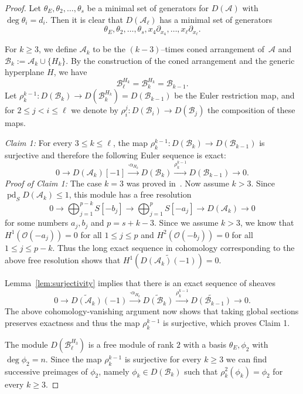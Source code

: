\documentclass[a4paper,11pt]{amsart}
\def\A{{\mathcal{A}}}%
\def\B{{\mathcal{B}}}%
\def\G{{\mathcal{G}}}%
\def\O{{\mathcal{O}}}%
\DeclareMathOperator{\pd}{pd}
\numberwithin{equation}{section}
\theoremstyle{remark}
\begin{document}
\begin{proof}
Let $\theta_E,\theta_2,\ldots,\theta_s$ be a minimal set of generators for $D(\A)$ with $\deg \theta_i=d_i$. Then it is clear that $D(\A_\ell)$ has a minimal set of generators 
$$
\theta_E,\theta_2,\ldots,\theta_s,x_4\partial_{x_4},\ldots,x_\ell\partial_{x_\ell}.
$$

For $k\ge 3$, we define $\A_k$ to be the $(k-3)$--times coned arrangement of~$\A$ and
$\B_k:=\A_k \cup \{H_k\}$.
By the construction of the coned arrangement and the generic hyperplane $H$, we have
\[
	\B_\ell^{H_k}=\B_k^{H_k} = \B_{k-1}.
\]
Let $\rho_k^{k-1}:D(\B_k)\to D(\B_k^{H_k})=D(\B_{k-1})$ be the Euler restriction map, and for $2\le j < i \le \ell$ we denote by $\rho_i^j:D(\B_i)\to D(\B_j)$ the composition of these maps.

\emph{Claim 1:} For every $3\le k \le \ell$, the map $\rho_k^{k-1}:D(\B_k)\to D(\B_{k-1})$ is surjective and therefore the following Euler sequence is exact:
\begin{equation}\label{eq:exact_euler}
0 \rightarrow D(\A_k)[-1] \stackrel{\cdot \alpha_{H_k}}{\rightarrow}
D(\B_k) \stackrel{\rho_k^{k-1}}{\rightarrow } D(\B_{k-1}) \rightarrow 0.
\end{equation}
\emph{Proof of Claim 1:}
The case $k=3$ was proved in~.
Now assume $k>3$.
Since $\pd_S D(\A_k)\le 1$, this module has a free resolution
$$
0 \rightarrow 
\bigoplus_{j=1}^{p - k} S[-b_j]
\rightarrow 
\bigoplus_{j=1}^{p} S[-a_j]
\rightarrow D(\A_k) \rightarrow 0
$$
for some numbers $a_j, b_j$ and $p=s+k-3$.
Since we assume $k>3$, we know that $H^1(\O(-a_j))=0$ for all $1\le j \le p$ and $H^2(\O(-b_j))=0$ for all $1\le j \le p-k$.
Thus the long exact sequence in cohomology corresponding to the above free resolution shows that $H^1(\widetilde{D(\A_k)(-1)})=0$.

Lemma~\ref{lem:surjectivity} implies that there is an exact sequence of sheaves
\[
0 \rightarrow 
\widetilde{D(\A_k)}(-1) \stackrel{\cdot \alpha_{H_k}}{\rightarrow}
\widetilde{D(\B_k)} \stackrel{\rho_k^{k-1}}{\rightarrow}
\widetilde{D(\B_{k-1})} \rightarrow 0.
\]
The above cohomology-vanishing argument now shows that taking global sections preserves exactness and thus the map $\rho_k^{k-1}$ is surjective, which proves Claim 1.

The module $D(\B_\ell^{H_3})$ is a free module of rank $2$ with a basis $\theta_E,\phi_2$ with $\deg \phi_2 = n$.
Since the map $\rho_k^{k-1}$ is surjective for every $k\ge 3$ we can find successive preimages of $\phi_2$, namely $\phi_k\in D(\B_k)$ such that $\rho_k^2(\phi_k)=\phi_2$ for every $k\ge 3$.


\end{proof}
\end{document}
